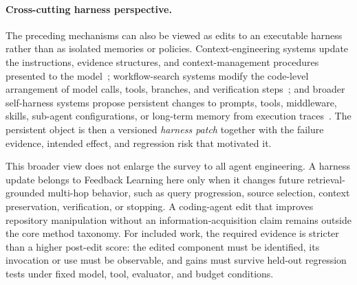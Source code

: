 \paragraph{Cross-cutting harness perspective.}
The preceding mechanisms can also be viewed as edits to an executable harness rather than as isolated memories or policies. Context-engineering systems update the instructions, evidence structures, and context-management procedures presented to the model~\cite{zhang2026ace,ye2026mce}; workflow-search systems modify the code-level arrangement of model calls, tools, branches, and verification steps~\cite{hu2025adas,zhang2025aflow}; and broader self-harness systems propose persistent changes to prompts, tools, middleware, skills, sub-agent configurations, or long-term memory from execution traces~\cite{zhang2026selfharness,lin2026ahe}. The persistent object is then a versioned \emph{harness patch} together with the failure evidence, intended effect, and regression risk that motivated it.

This broader view does not enlarge the survey to all agent engineering. A harness update belongs to Feedback Learning here only when it changes future retrieval-grounded multi-hop behavior, such as query progression, source selection, context preservation, verification, or stopping. A coding-agent edit that improves repository manipulation without an information-acquisition claim remains outside the core method taxonomy. For included work, the required evidence is stricter than a higher post-edit score: the edited component must be identified, its invocation or use must be observable, and gains must survive held-out regression tests under fixed model, tool, evaluator, and budget conditions.
